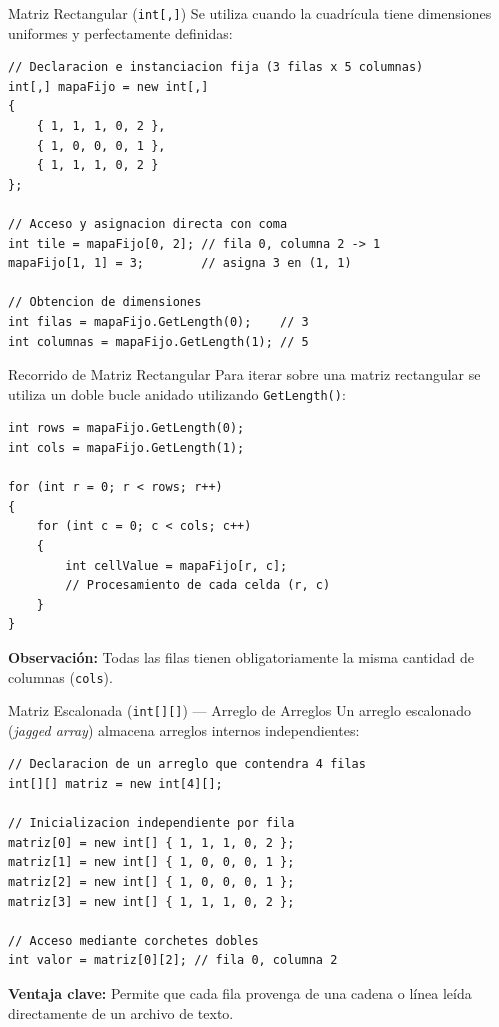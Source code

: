 \documentclass{beamer}
\begin{document}
\begin{frame}[fragile]{Matriz Rectangular (\texttt{int[,]})}
\lstset{style=CSharpStyle}
Se utiliza cuando la cuadr\'icula tiene dimensiones uniformes y perfectamente definidas:

\begin{lstlisting}
// Declaracion e instanciacion fija (3 filas x 5 columnas)
int[,] mapaFijo = new int[,]
{
    { 1, 1, 1, 0, 2 },
    { 1, 0, 0, 0, 1 },
    { 1, 1, 1, 0, 2 }
};

// Acceso y asignacion directa con coma
int tile = mapaFijo[0, 2]; // fila 0, columna 2 -> 1
mapaFijo[1, 1] = 3;        // asigna 3 en (1, 1)

// Obtencion de dimensiones
int filas = mapaFijo.GetLength(0);    // 3
int columnas = mapaFijo.GetLength(1); // 5
\end{lstlisting}
\end{frame}

\begin{frame}[fragile]{Recorrido de Matriz Rectangular}
\lstset{style=CSharpStyle}
Para iterar sobre una matriz rectangular se utiliza un doble bucle anidado utilizando \texttt{GetLength()}:

\begin{lstlisting}
int rows = mapaFijo.GetLength(0);
int cols = mapaFijo.GetLength(1);

for (int r = 0; r < rows; r++)
{
    for (int c = 0; c < cols; c++)
    {
        int cellValue = mapaFijo[r, c];
        // Procesamiento de cada celda (r, c)
    }
}
\end{lstlisting}

\vspace{0.2cm}
\textbf{Observaci\'on:} Todas las filas tienen obligatoriamente la misma cantidad de columnas (\texttt{cols}).
\end{frame}

\begin{frame}[fragile]{Matriz Escalonada (\texttt{int[][]}) --- Arreglo de Arreglos}
\lstset{style=CSharpStyle}
Un arreglo escalonado (\textit{jagged array}) almacena arreglos internos independientes:

\begin{lstlisting}
// Declaracion de un arreglo que contendra 4 filas
int[][] matriz = new int[4][];

// Inicializacion independiente por fila
matriz[0] = new int[] { 1, 1, 1, 0, 2 };
matriz[1] = new int[] { 1, 0, 0, 0, 1 };
matriz[2] = new int[] { 1, 0, 0, 0, 1 };
matriz[3] = new int[] { 1, 1, 1, 0, 2 };

// Acceso mediante corchetes dobles
int valor = matriz[0][2]; // fila 0, columna 2
\end{lstlisting}

\vspace{0.2cm}
\textbf{Ventaja clave:} Permite que cada fila provenga de una cadena o l\'inea le\'ida directamente de un archivo de texto.
\end{frame}
\end{document}
